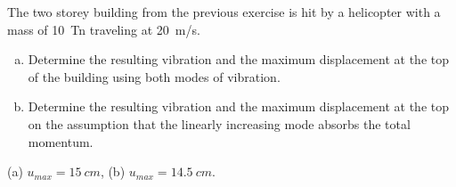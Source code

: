 
\begin{Exercise}[label={two_storey_helicopter}]
The two storey building from the previous exercise is hit by a helicopter with a mass of \qty{10}{Tn} traveling at \qty{20}{m/s}.
\begin{enumerate}[(a)]
    \item Determine the resulting vibration and the maximum displacement at the top of the building using both modes of vibration.
    \item Determine the resulting vibration and the maximum displacement at the top on the assumption that the linearly increasing mode absorbs the total momentum.
\end{enumerate}
\shortAnswer (a) $u_{max} = \SI{15}{cm}$, (b) $u_{max} = \SI{14.5}{cm}$.
\end{Exercise}



